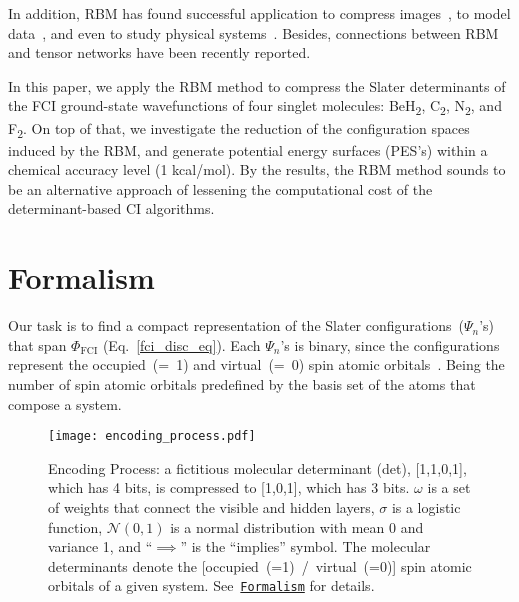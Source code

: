 \documentclass[%
 amsmath,amssymb,
 aps,prl, %
 reprint,%
]{revtex4-1}
\begin{document}
\indent In addition, RBM has found successful application to compress images~\cite{Hinton2006a,Torralba2008,Cheng2016,Lokare2015}, to model data~\cite{Salakhutdinov2007,Larochelle2008,Freund1992,Xing2012,Fiore2013,Hinton2007}, and even to study physical systems~\cite{Carleo2017,Nomura2017,Lesieur2017,Weinstein2017,Aoki2016,Huang2017a,Decelle2018,Deng2017,Biamonte2017,Deng2017a}. Besides, connections between RBM and tensor networks have been recently reported.~\cite{Chen2018,Huang2017}  

\indent In this paper, we apply the RBM method to compress the Slater determinants of the FCI ground-state wavefunctions of four singlet molecules: BeH\textsubscript{2}, C\textsubscript{2}, N\textsubscript{2}, and
F\textsubscript{2}. On top of that, we investigate the reduction of the configuration spaces induced by the RBM, and generate potential energy surfaces (PES's) within a chemical accuracy level (1 kcal/mol). By the results, the RBM method sounds to be an alternative approach of lessening the computational cost of the determinant-based CI algorithms.  	

\hypertarget{sec:formalism}{}
\section{Formalism}


\indent Our task is to find a compact representation of the Slater configurations~($\Psi_{n}$'s) that span $\Phi_{\text{FCI}}$ (Eq.~\ref{fci_disc_eq}). Each $\Psi_{n}$'s is binary, since the configurations represent the occupied~(=~1) and virtual~(=~0) spin atomic orbitals~\cite{Szabo1989, Mayer2003,Helgaker2000}. Being the number of spin atomic orbitals predefined by the basis set of the atoms that compose a system.~\cite{Szabo1989,Helgaker2000}

\begin{figure}[t]
    \hypertarget{fig:encoding_process}{}
    \centering
    \texttt{[image: encoding\_process.pdf]} 
    \caption{Encoding Process: a fictitious molecular determinant (det), [1,1,0,1], which has 4 bits, is compressed to [1,0,1], which has 3 bits. $\omega$ is a set of weights that connect the visible and hidden layers, $\sigma$ is a logistic function, $\mathcal{N}(0,1)$ is a normal distribution with mean 0 and variance 1, and ``$\scriptstyle \implies$'' is the ``implies'' symbol. The molecular determinants denote the [occupied~(=1)~/~virtual~(=0)] spin atomic orbitals of a given system. See~\protect\hyperlink{sec:formalism}{\texttt{Formalism}} for details.~\cite{Figures_Paper}}
\end{figure}
%
\end{document}
